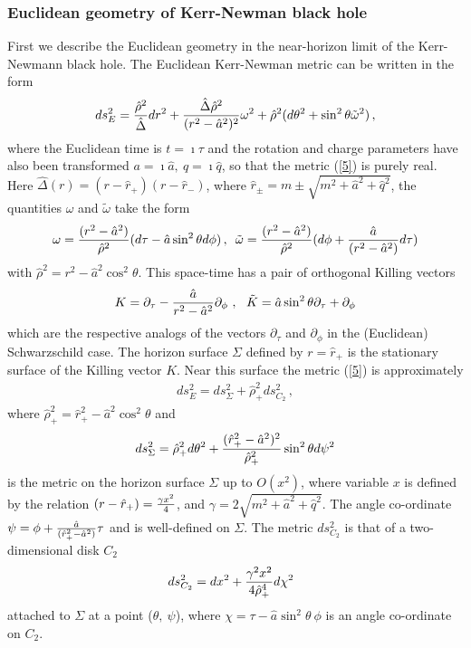 \documentclass[12pt]{article}
\def\be{\begin{eqnarray}}
\def\ee{\end{eqnarray}}
\def\lb{\label}
\begin{document}
\subsubsection{Euclidean geometry of Kerr-Newman  black hole}
First we describe the Euclidean  geometry in the near-horizon limit of  the Kerr-Newmann black hole.
The Euclidean Kerr-Newman metric can be written in the form
\begin{equation}
ds^2_E={\hat{\rho}^2\over \hat{\Delta}}dr^2+{\hat{\Delta}\hat{\rho}^2\over
(r^2-\hat{a}^2)^2}\omega^2+\hat{\rho}^2(d\theta^2+\sin^2\theta \tilde{\omega}^2)\, ,
\label{5}
\end{equation}
where the Euclidean time is $t=\imath \tau$ and
the rotation and charge parameters have also been transformed
$a=\imath \hat{a},~q=\imath \hat{q}$, so
that the metric (\ref{5}) is purely real. Here
$\hat{\Delta}(r)=(r-\hat{r}_+)(r-\hat{r}_-)$,
where $\hat{r}_{\pm}=m\pm \sqrt{m^2+\hat{a}^2+\hat{q}^2}$,
the quantities $\omega$ and $\tilde{\omega}$ take the form 
\begin{equation}
\omega={(r^2-\hat{a}^2)\over \hat{\rho}^2}
(d\tau-\hat{a}\sin^2\theta d \phi ) \, , \,\,\,
\tilde{\omega}={(r^2-\hat{a}^2)\over 
\hat{\rho}^2}(d\phi+{\hat{a}\over (r^2-\hat{a}^2)}d\tau) 
\label{4-4}
\end{equation}
with $\hat{\rho}^2=r^2-\hat{a}^2 \cos^2 \theta$.
This space-time has a pair of orthogonal Killing vectors
\begin{equation}
K=\partial_\tau-{\hat{a}\over r^2-\hat{a}^2}\partial_\phi~,
~~\tilde{K}=\hat{a}\sin^2\theta \partial_\tau+\partial_\phi \label{4a}
\end{equation}
which are the respective analogs of the
vectors $\partial_\tau$ and $\partial_\phi$ in the (Euclidean)
Schwarzschild case.
The horizon surface $\Sigma$ defined by $r=\hat{r}_+$ is the stationary 
surface of the Killing vector $K$. Near this surface
the metric (\ref{5}) is approximately
\be
ds^2_E=ds^2_\Sigma+\hat{\rho}^2_+ ds^2_{C_2}\, ,
\lb{near-horizon limit}
\ee
where $\hat{\rho}^2_+=\hat{r}^2_+ -\hat{a}^2\cos^2\theta$ and
\begin{equation}
ds^2_\Sigma
=\hat{\rho}_+^2d\theta^2+{(\hat{r}^2_+-\hat{a}^2)^2\over\hat{\rho}_+^2}   
\sin^2\theta d\psi^2
\label{8}
\end{equation}
is the metric on the horizon surface $\Sigma$
up to $O(x^2)$, where variable $x$ is defined by  the relation $(r-\hat{r}_+)={\gamma x^2 \over 4}$, and
$\gamma=2\sqrt{m^2+\hat{a}^2+\hat{q}^2}$.
 The angle co-ordinate 
$\psi=\phi+{\hat{a} \over (\hat{r}^2_+-\hat{a}^2)} \tau$
and is well-defined on $\Sigma$. 
The metric $ds^2_{C_2}$ is that of a two-dimensional disk $C_2$ 
\begin{equation}
ds^2_{C_2}=dx^2+{\gamma^2 x^2\over 4 \hat{\rho}_+^4}d\chi^2~~
\label{11}
\end{equation}
attached to $\Sigma$ at a point ($\theta,~\psi$),
where $\chi=\tau-\hat{a}\sin^2\theta\ \phi$ is an angle
co-ordinate on $C_2$.
\end{document}
